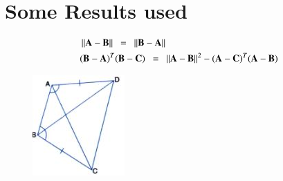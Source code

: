 \documentclass[journal,12pt,twocolumn]{IEEEtran}
\begin{document}
\section{Some Results used}
\begin{align}
 & \left\lVert\mathbf{A}-\mathbf{B}\right\rVert \enspace = \enspace   \left\lVert\mathbf{B}-\mathbf{A}\right\rVert \\
 & (\mathbf{B}-\mathbf{A})^T(\mathbf{B}-\mathbf{C}) \enspace = \enspace \left\lVert\mathbf{A}-\mathbf{B}\right\rVert^2 - (\mathbf{A}-\mathbf{C})^T(\mathbf{A}-\mathbf{B}) 
\end{align}
\renewcommand{\thefigure}{1}
\begin{figure}[!htb]
	\centering
	\includegraphics[width=\columnwidth]{assignment3fig.jpg}
	\caption{\label{fig1}}
	\label{fig:1}
\end{figure}
\end{document}
